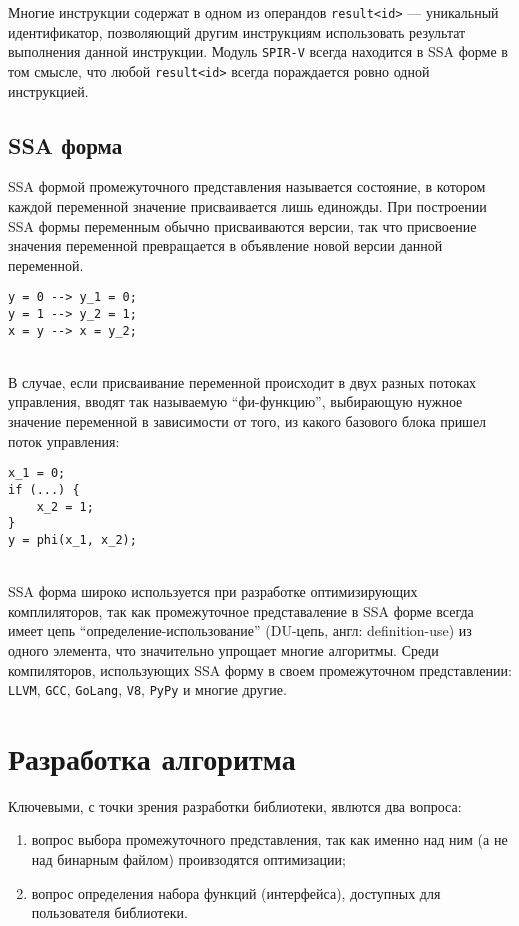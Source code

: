 \documentclass[14pt]{extarticle}
\begin{document}
Многие инструкции содержат в одном из операндов \texttt{result<id>} --- уникальный идентификатор, позволяющий другим инструкциям использовать результат выполнения данной инструкции. Модуль \texttt{SPIR-V} всегда находится в SSA форме в том смысле, что любой \texttt{result<id>} всегда пораждается ровно одной инструкцией.

\subsection{SSA форма}
SSA формой промежуточного представления называется состояние, в котором каждой переменной значение присваивается лишь единожды. При построении SSA формы переменным обычно присваиваются версии, так что присвоение значения переменной превращается в объявление новой версии данной переменной.
\begin{lstlisting}[caption={пример построения простейшей SSA формы}, captionpos=b]
y = 0 --> y_1 = 0;
y = 1 --> y_2 = 1;
x = y --> x = y_2;
\end{lstlisting}

~\\ %

В случае, если присваивание переменной происходит в двух разных потоках управления, вводят так называемую \enquote{фи-функцию}, выбирающую нужное значение переменной в зависимости от того, из какого базового блока пришел поток управления:
\begin{lstlisting}[caption={фи-функция SSA формы}]
x_1 = 0;
if (...) {
    x_2 = 1;
}
y = phi(x_1, x_2);
\end{lstlisting}

~\\ %

SSA форма широко используется при разработке оптимизирующих комплиляторов, так как промежуточное представаление в SSA форме всегда имеет цепь \enquote{определение-использование} (DU-цепь, англ: definition-use) из одного элемента, что значительно упрощает многие алгоритмы. Среди компиляторов, использующих SSA форму в своем промежуточном представлении: \texttt{LLVM}, \texttt{GCC}, \texttt{GoLang}, \texttt{V8}, \texttt{PyPy} и многие другие.


\newpage
\section{Разработка алгоритма}
Ключевыми, с точки зрения разработки библиотеки, явлются два вопроса:
\begin{enumerate}
	\item вопрос выбора промежуточного представления, так как именно над ним (а не над бинарным файлом) проивзодятся оптимизации;
	\item вопрос определения набора функций (интерфейса), доступных для пользователя библиотеки.
\end{enumerate}
\end{document}
